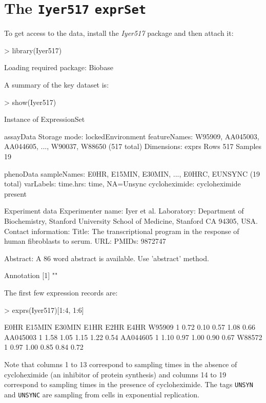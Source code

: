 \documentclass[12pt]{article}
\begin{document}
\section{The {\tt Iyer517} {\tt exprSet}}
To get access to the data, install the
{\it Iyer517} package and then attach it:
\begin{Schunk}
\begin{Sinput}
> library(Iyer517)
\end{Sinput}
\begin{Soutput}
Loading required package: Biobase
\end{Soutput}
\end{Schunk}
A summary of the key dataset is:
\begin{Schunk}
\begin{Sinput}
> show(Iyer517)
\end{Sinput}
\begin{Soutput}
Instance of ExpressionSet 

assayData
  Storage mode: lockedEnvironment 
  featureNames: W95909, AA045003, AA044605, ..., W90037, W88650 (517 total)
  Dimensions:
        exprs
Rows      517
Samples    19

phenoData
  sampleNames: E0HR, E15MIN, E30MIN, ..., E0HRC, EUNSYNC (19 total)
  varLabels:
    time.hrs: time, NA=Unsync
    cycloheximide: cycloheximide present

Experiment data
  Experimenter name: Iyer et al. 
  Laboratory: Department of Biochemistry, Stanford University School of Medicine, Stanford CA 94305, USA. 
  Contact information:  
  Title: The transcriptional program in the response of human fibroblasts to serum. 
  URL:  
  PMIDs: 9872747 

  Abstract: A 86 word abstract is available. Use 'abstract' method.

Annotation [1] ""
\end{Soutput}
\end{Schunk}
The first few expression records are:
\begin{Schunk}
\begin{Sinput}
> exprs(Iyer517)[1:4, 1:6]
\end{Sinput}
\begin{Soutput}
         E0HR E15MIN E30MIN E1HR E2HR E4HR
W95909      1   0.72   0.10 0.57 1.08 0.66
AA045003    1   1.58   1.05 1.15 1.22 0.54
AA044605    1   1.10   0.97 1.00 0.90 0.67
W88572      1   0.97   1.00 0.85 0.84 0.72
\end{Soutput}
\end{Schunk}
Note that columns 1 to 13 correspond to sampling times
in the absence of cycloheximide (an inhibitor of protein synthesis)
and columns 14 to 19 correspond to sampling times
in the presence of cycloheximide.  The tags {\tt UNSYN}
and {\tt UNSYNC} are sampling from cells in exponential
replication.
\end{document}
